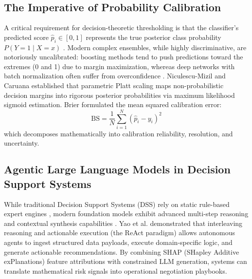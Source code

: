 \documentclass[journal,compsoc]{IEEEtran}
\begin{document}
\subsection{The Imperative of Probability Calibration}
A critical requirement for decision-theoretic thresholding is that the classifier's predicted score $\hat{p}_i \in [0, 1]$ represents the true posterior class probability $P(Y=1 \mid X=x)$ \cite{guo2017calibration, niculescu2005predicting}. Modern complex ensembles, while highly discriminative, are notoriously uncalibrated: boosting methods tend to push predictions toward the extremes (0 and 1) due to margin maximization, whereas deep networks with batch normalization often suffer from overconfidence \cite{guo2017calibration}. Niculescu-Mizil and Caruana \cite{niculescu2005predicting} established that parametric Platt scaling \cite{platt1999probabilistic} maps non-probabilistic decision margins into rigorous posterior probabilities via maximum likelihood sigmoid estimation. Brier \cite{brier1950verification} formulated the mean squared calibration error:
\begin{equation}
\text{BS} = \frac{1}{N} \sum_{i=1}^N (\hat{p}_i - y_i)^2
\label{eq:brier}
\end{equation}
which decomposes mathematically into calibration reliability, resolution, and uncertainty.

\subsection{Agentic Large Language Models in Decision Support Systems}
While traditional Decision Support Systems (DSS) rely on static rule-based expert engines \cite{power2008understanding}, modern foundation models exhibit advanced multi-step reasoning and contextual synthesis capabilities \cite{achiam2023gpt4, park2023generative, yao2023react}. Yao et al. \cite{yao2023react} demonstrated that interleaving reasoning and actionable execution (the ReAct paradigm) allows autonomous agents to ingest structured data payloads, execute domain-specific logic, and generate actionable recommendations. By combining SHAP (SHapley Additive exPlanations) feature attributions \cite{lundberg2017unified} with constrained LLM generation, systems can translate mathematical risk signals into operational negotiation playbooks.
\end{document}
